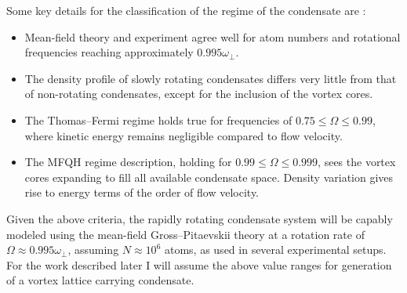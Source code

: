 Some key details for the classification of the regime of the condensate are \cite{BEC:Fetter_revmodphys_2009}:
\begin{itemize}
\item Mean-field theory and experiment agree well for atom numbers and rotational frequencies reaching approximately $0.995\omega_{\perp}$.
\item The density profile of slowly rotating condensates differs very little from that of non-rotating condensates, except for the inclusion of the vortex cores.
\item The Thomas--Fermi regime holds true for frequencies of $0.75 \leq \Omega \leq 0.99$, where kinetic energy remains negligible compared to flow velocity.
\item The MFQH regime description, holding for $0.99 \leq \Omega \leq 0.999$, sees the vortex cores expanding to fill all available condensate space. Density variation gives rise to energy terms of the order of flow velocity.
\end{itemize}

Given the above criteria, the rapidly rotating condensate system will be capably modeled using the mean-field Gross--Pitaevskii theory at a rotation rate of $\Omega \approx 0.995\omega_{\perp}$, assuming $N\approx 10^6$ atoms, as used in several experimental setups. For the work described later I will assume the above value ranges for generation of a vortex lattice carrying condensate.

